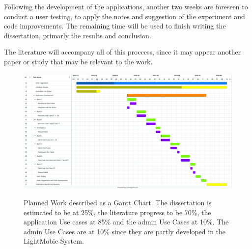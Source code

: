   Following the development of the applications, another two weeks are foreseen to conduct a user testing, to apply the notes and suggestion of the experiment and code improvements.
  The remaining time will be used to finish writing the dissertation, primarly the results and conclusion.
  
  The literature will accompany all of this proccess, since it may appear another paper or study that may be relevant to the work.


    \begin{figure}[h]
      \caption{Planned Work described as a Gantt Chart. The dissertation is estimated to be at 25\%, the literature progress to be 70\%, the application Use cases at 85\% and the admin Use Cases at 10\%. The admin Use Cases are at 10\% since they are partly developed in the LightMobie System.}
      \centering
      \includegraphics[width=\textwidth]{figs/Gantt}
      \label{fig:figure1}
    \end{figure}
